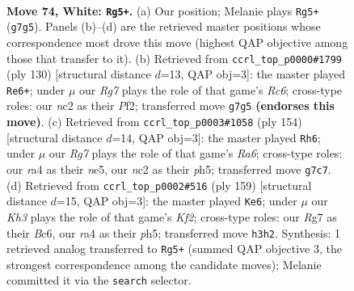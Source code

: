 \documentclass[11pt]{article}
\begin{document}
\clearpage

\begin{figure}[p]\centering
\begin{subfigure}{0.46\textwidth}\centering
\resizebox{\linewidth}{!}{%
\newchessgame
\chessboard[
  setfen={8/6R1/5B2/7k/r7/7K/2n1bP2/8 w - - 8 74},
  showmover=false,
  pgfstyle=straightmove, color=movearrow, markmove={g7-g5}
]}
\caption{}
\end{subfigure}\hfill
\begin{subfigure}{0.46\textwidth}\centering
\resizebox{\linewidth}{!}{%
\newchessgame
\chessboard[
  setfen={8/4k3/2R5/5B2/1b6/8/5PK1/r7 w - - 9 66},
  showmover=false,
  pgfstyle=straightmove, color=movearrow, markmove={c6-e6}
]}
\caption{}
\end{subfigure}
\\[4pt]
\begin{subfigure}{0.46\textwidth}\centering
\resizebox{\linewidth}{!}{%
\newchessgame
\chessboard[
  setfen={8/4k3/R7/4n1pp/1b2B3/8/4K3/8 w - - 2 78},
  showmover=false,
  pgfstyle=straightmove, color=movearrow, markmove={a6-h6}
]}
\caption{}
\end{subfigure}\hfill
\begin{subfigure}{0.46\textwidth}\centering
\resizebox{\linewidth}{!}{%
\newchessgame
\chessboard[
  setfen={8/5k2/2b5/7P/2NB1b2/8/5K2/8 b - - 0 80},
  showmover=false,
  pgfstyle=straightmove, color=movearrow, markmove={f7-e6}
]}
\caption{}
\end{subfigure}
\caption{\textbf{Move 74, White: \texttt{Rg5+}.} (a) Our position; Melanie plays \texttt{Rg5+} (\texttt{g7g5}). Panels (b)--(d) are the retrieved master positions whose correspondence most drove this move (highest QAP objective among those that transfer to it). (b) Retrieved from \texttt{ccrl\_top\_p0000\#1799} (ply 130) [structural distance $d$=13, QAP obj=3]: the master played \texttt{Re6+}; under $\mu$ our \emph{Rg7} plays the role of that game's \emph{Rc6}; cross-type roles: our \emph{n}c2 as their \emph{P}f2; transferred move \texttt{g7g5} \textbf{(endorses this move)}. (c) Retrieved from \texttt{ccrl\_top\_p0003\#1058} (ply 154) [structural distance $d$=14, QAP obj=3]: the master played \texttt{Rh6}; under $\mu$ our \emph{Rg7} plays the role of that game's \emph{Ra6}; cross-type roles: our \emph{r}a4 as their \emph{n}e5, our \emph{n}c2 as their \emph{p}h5; transferred move \texttt{g7c7}. (d) Retrieved from \texttt{ccrl\_top\_p0002\#516} (ply 159) [structural distance $d$=15, QAP obj=3]: the master played \texttt{Ke6}; under $\mu$ our \emph{Kh3} plays the role of that game's \emph{Kf2}; cross-type roles: our \emph{R}g7 as their \emph{B}c6, our \emph{r}a4 as their \emph{p}h5; transferred move \texttt{h3h2}. Synthesis: 1 retrieved analog transferred to \texttt{Rg5+} (summed QAP objective 3, the strongest correspondence among the candidate moves); Melanie committed it via the \texttt{search} selector.}
\label{fig:thought-m146}
\end{figure}
\end{document}
